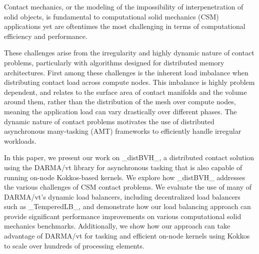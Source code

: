 Contact mechanics, or the modeling of the impossibility of interpenetration of solid objects, is fundamental to computational solid mechanics (CSM) applications yet are oftentimes the most challenging in terms of computational efficiency and performance.

These challenges arise from the irregularity and highly dynamic nature of contact problems, particularly with algorithms designed for distributed memory architectures. First among these challenges is the inherent load imbalance when distributing contact load across compute nodes. This imbalance is highly problem dependent, and relates to the surface area of contact manifolds and the volume around them, rather than the distribution of the mesh over compute nodes, meaning the application load can vary drastically over different phases. The dynamic nature of contact problems motivates the use of distributed asynchronous many-tasking (AMT) frameworks to efficiently handle irregular workloads.

In this paper, we present our work on \_distBVH\_, a distributed contact solution using the DARMA/vt library for asynchronous tasking that is also capable of running on-node Kokkos-based kernels. We explore how \_distBVH\_ addresses the various challenges of CSM contact problems. We evaluate the use of many of DARMA/vt's dynamic load balancers, including decentralized load balancers such as \_TemperedLB\_, and demonstrate how our load balancing approach can provide significant performance improvements on various computational solid mechanics benchmarks. Additionally, we show how our approach can take advantage of DARMA/vt for tasking and efficient on-node kernels using Kokkos to scale over hundreds of processing elements.
